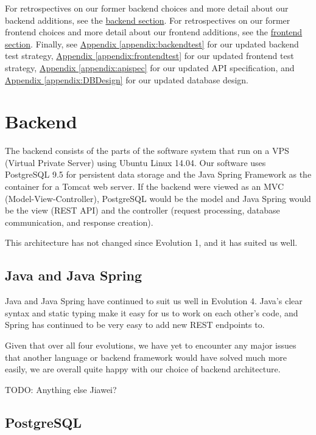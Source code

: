 \documentclass[12pt]{article}
\begin{document}
For retrospectives on our former backend choices and more detail about our backend additions, see the \hyperref[sec:Backend]{backend section}. For retrospectives on our former frontend choices and more detail about our frontend additions, see the \hyperref[sec:Frontend]{frontend section}. Finally, see \hyperref[appendix:backendtest]{Appendix \ref{appendix:backendtest}} for our updated backend test strategy,  \hyperref[appendix:frontendtest]{Appendix \ref{appendix:frontendtest}} for our updated frontend test strategy, \hyperref[appendix:apispec]{Appendix \ref{appendix:apispec}} for our updated API specification, and \hyperref[appendix:DBDesign]{Appendix \ref{appendix:DBDesign}} for our updated database design. 

\section{Backend}

\label{sec:Backend}
The backend consists of the parts of the software system that run on a VPS (Virtual Private Server) using Ubuntu Linux 14.04. Our software uses PostgreSQL 9.5 for persistent data storage and the Java Spring Framework as the container for a Tomcat web server. If the backend were viewed as an MVC (Model-View-Controller), PostgreSQL would be the model and Java Spring would be the view (REST API) and the controller (request processing, database communication, and response creation). 

This architecture has not changed since Evolution 1, and it has suited us well. 

\subsection{Java and Java Spring}
Java and Java Spring have continued to suit us well in Evolution 4. Java's clear syntax and static typing make it easy for us to work on each other's code, and Spring has continued to be very easy to add new REST endpoints to. 

Given that over all four evolutions, we have yet to encounter any major issues that another language or backend framework would have solved much more easily, we are overall quite happy with our choice of backend architecture. 

{\huge TODO: Anything else Jiawei?}



\subsection{PostgreSQL}
\end{document}
